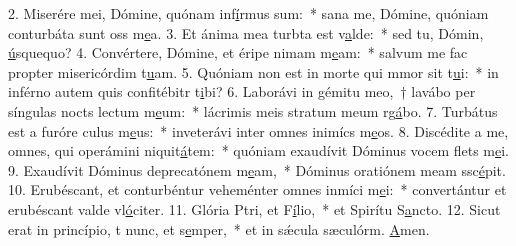 2. Miserére mei, Dómine, quónam inf\uline{í}rmus sum:~* sana me, Dómine, quóniam conturbáta sunt oss m\uline{e}a.
3. Et ánima mea turbta est v\uline{a}lde:~* sed tu, Dómin, \uline{ú}squequo?
4. Convértere, Dómine, et éripe nimam m\uline{e}am:~* salvum me fac propter misericórdim t\uline{u}am.
5. Quóniam non est in morte qui mmor sit t\uline{u}i:~* in inférno autem quis confitébitr t\uline{i}bi?
6. Laborávi in gémitu meo,~† lavábo per síngulas nocts lectum m\uline{e}um:~* lácrimis meis stratum meum rg\uline{á}bo.
7. Turbátus est a furóre culus m\uline{e}us:~* inveterávi inter omnes inimícs m\uline{e}os.
8. Discédite a me, omnes, qui operámini niquit\uline{á}tem:~* quóniam exaudívit Dóminus vocem flets m\uline{e}i.
9. Exaudívit Dóminus deprecatónem m\uline{e}am,~* Dóminus oratiónem meam ssc\uline{é}pit.
10. Erubéscant, et conturbéntur veheménter omnes inmíci m\uline{e}i:~* convertántur et erubéscant valde vl\uline{ó}citer.
11. Glória Ptri, et F\uline{í}lio,~* et Spirítu S\uline{a}ncto.
12. Sicut erat in princípio, t nunc, et s\uline{e}mper,~* et in sǽcula sæculórm. \uline{A}men.

